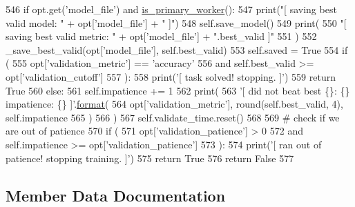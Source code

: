 \begin{DoxyCode}
546             \textcolor{keywordflow}{if} opt.get(\textcolor{stringliteral}{'model\_file'}) \textcolor{keywordflow}{and} \hyperlink{namespaceparlai_1_1utils_1_1distributed_a9bb1dac198180590ef8c6b6c6f9fc2c4}{is\_primary\_worker}():
547                 print(\textcolor{stringliteral}{"[ saving best valid model: "} + opt[\textcolor{stringliteral}{'model\_file'}] + \textcolor{stringliteral}{" ]"})
548                 self.save\_model()
549                 print(
550                     \textcolor{stringliteral}{"[ saving best valid metric: "} + opt[\textcolor{stringliteral}{'model\_file'}] + \textcolor{stringliteral}{".best\_valid ]"}
551                 )
552                 \_save\_best\_valid(opt[\textcolor{stringliteral}{'model\_file'}], self.best\_valid)
553                 self.saved = \textcolor{keyword}{True}
554             \textcolor{keywordflow}{if} (
555                 opt[\textcolor{stringliteral}{'validation\_metric'}] == \textcolor{stringliteral}{'accuracy'}
556                 \textcolor{keywordflow}{and} self.best\_valid >= opt[\textcolor{stringliteral}{'validation\_cutoff'}]
557             ):
558                 print(\textcolor{stringliteral}{'[ task solved! stopping. ]'})
559                 \textcolor{keywordflow}{return} \textcolor{keyword}{True}
560         \textcolor{keywordflow}{else}:
561             self.impatience += 1
562             print(
563                 \textcolor{stringliteral}{'[ did not beat best \{\}: \{\} impatience: \{\} ]'}.\hyperlink{namespaceparlai_1_1chat__service_1_1services_1_1messenger_1_1shared__utils_a32e2e2022b824fbaf80c747160b52a76}{format}(
564                     opt[\textcolor{stringliteral}{'validation\_metric'}], round(self.best\_valid, 4), self.impatience
565                 )
566             )
567         self.validate\_time.reset()
568 
569         \textcolor{comment}{# check if we are out of patience}
570         \textcolor{keywordflow}{if} (
571             opt[\textcolor{stringliteral}{'validation\_patience'}] > 0
572             \textcolor{keywordflow}{and} self.impatience >= opt[\textcolor{stringliteral}{'validation\_patience'}]
573         ):
574             print(\textcolor{stringliteral}{'[ ran out of patience! stopping training. ]'})
575             \textcolor{keywordflow}{return} \textcolor{keyword}{True}
576         \textcolor{keywordflow}{return} \textcolor{keyword}{False}
577 
\end{DoxyCode}


\subsection{Member Data Documentation}
\mbox{\label{classparlai_1_1scripts_1_1train__model_1_1TrainLoop_a04b7275f3ab548989a48161a7f1b8f3c}} 

